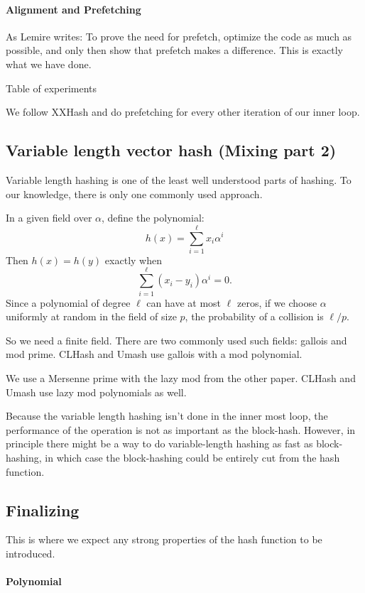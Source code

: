 \paragraph{Alignment and Prefetching}

As Lemire writes:
To prove the need for prefetch, optimize the code as much as possible, and only then show that prefetch makes a difference.
This is exactly what we have done.

Table of experiments

We follow XXHash and do prefetching for every other iteration of our inner loop.

\subsection{Variable length vector hash (Mixing part 2)}

Variable length hashing is one of the least well understood parts of hashing.
To our knowledge, there is only one commonly used approach.

In a given field over $\alpha$, define the polynomial:
\[h(x) = \sum_{i=1}^\ell x_i \alpha^i\]
Then $h(x)=h(y)$ exactly when
\[\sum_{i=1}^\ell (x_i-y_i) \alpha^i = 0.\]
Since a polynomial of degree $\ell$ can have at most $\ell$ zeros,
if we choose $\alpha$ uniformly at random in the field of size $p$,
the probability of a collision is $\ell/p$.

So we need a finite field.
There are two commonly used such fields: gallois and mod prime.
CLHash and Umash use gallois with a mod polynomial.

We use a Mersenne prime
with the lazy mod from the other paper.
CLHash and Umash use lazy mod polynomials as well.

Because the variable length hashing isn't done in the inner most loop,
the performance of the operation is not as important as the block-hash.
However, in principle there might be a way to do variable-length hashing as fast as block-hashing, in which case the block-hashing could be entirely cut from the hash function.


\subsection{Finalizing}

This is where we expect any strong properties of the hash function to be introduced.

\paragraph{Polynomial}
